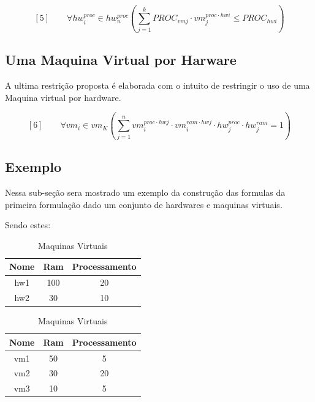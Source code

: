  $$ [5] \qquad  \forall hw_{i}^{proc} \in hw_{n}^{proc} (\sum_{j = 1}^{k}  PROC_{vmj}
\cdot vm^{proc \cdot hwi}_{j} \leq PROC_{hwi})  $$


\subsection{Uma Maquina Virtual por Harware}

A ultima restrição proposta é elaborada com o intuito de restringir o uso de uma Maquina virtual por hardware.

$$[6] \qquad \forall vm_{i} \in vm_{K} (\sum_{j = 1}^{n} vm_i^{proc \cdot hwj} \cdot vm_{i}^{ram \cdot hwj} \cdot hw_{j}^{proc} \cdot hw_{j}^{ram} = 1) $$
  
\subsection{Exemplo}

Nessa sub-seção sera mostrado um exemplo da construção das formulas da primeira formulação dado um conjunto de hardwares e maquinas virtuais.

Sendo estes:

\begin{table}[!htb]
    \caption{hardware e maquinas virtuais}
    \begin{minipage}{.5\linewidth}
      \caption{Hardware}
      \centering
        \begin{tabular}{ |c|c|c| } 
            \hline
            Nome & Ram & Processamento\\
            \hline
             hw1 & 100 & 20  \\ 
             hw2 & 30 & 10  \\ 

            \hline
        \end{tabular}
    \end{minipage}%
    \begin{minipage}{.5\linewidth}
      \centering
        \caption{Maquinas Virtuais}
        \begin{tabular}{ |c|c|c| } 
            \hline
            Nome & Ram & Processamento\\
            \hline
            vm1 & 50  & 5  \\ 
            vm2  & 30 & 20  \\ 
            vm3 & 10 & 5   \\
            \hline
        \end{tabular}
    \end{minipage} 
\end{table}

